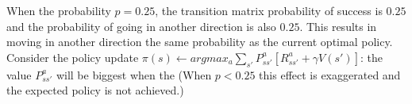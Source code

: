 \documentclass[12pt,a4paper]{report}
\begin{document}
\begin{landscape}
\begin{center}
\begin{tabular}{c || c  c  c}
    \end{tabular}        
\end{center}
\end{landscape}
\break

When the probability $p = 0.25$, the transition matrix probability
of success is $0.25$ and the probability of going in another direction
is also $0.25$. 
This results in moving in another direction the same probability 
as the current optimal policy. Consider the policy update $\pi(s) \leftarrow
argmax_a \sum_{s'} P^a_{ss'}[R^a_{ss'} + \gamma V(s')]$: the value $P^a_{ss'}$ 
will be biggest when the 
(When $p < 0.25$ this effect is exaggerated and the expected policy 
is not achieved.)
\end{document}
